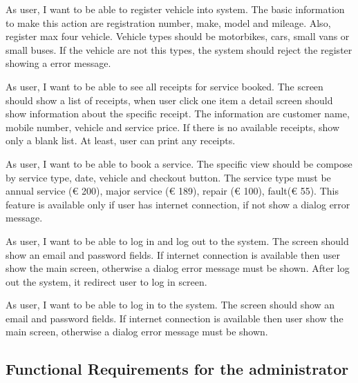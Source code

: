 \begin{description}[font=$\bullet$~\normalfont\scshape\color{red!50!black}]

\item [Register vehicle] As user, I want to be able to register vehicle into system. The  basic information to make this action are registration number, make, model and mileage. Also, register max four vehicle. Vehicle types should be motorbikes, cars, small vans or small buses. If the vehicle are not this types, the system should reject the register showing a error message.

\item [View receipts]As user, I want to be able to see all receipts for service booked. The screen should show a list of receipts, when user click  one item a detail screen should show information about the specific receipt. The information are customer name, mobile number, vehicle and service price. If there is no available receipts, show only a blank list. At least, user can print any receipts.

\item [Book service] As user, I want to be able to book a service. The specific view should be compose by service type, date, vehicle and checkout button. The service  type must be annual service (€ 200), major service (€ 189), repair (€ 100), fault(€ 55). This feature is available only if user has internet connection, if not show a dialog error message.

\item [Log in] As user, I want to be able to log in and log out to the system. The screen should  show an email and password fields. If internet connection is available then user show the main screen, otherwise a dialog error message must be shown. After log out the system, it redirect user to log in screen.

\item [Log in] As user, I want to be able to log in to the system. The screen should  show an email and password fields. If internet connection is available then user show the main screen, otherwise a dialog error message must be shown.

\end{description}

\subsection{Functional Requirements for the administrator}

